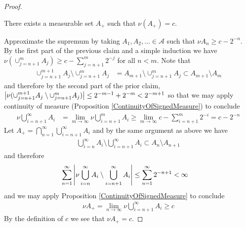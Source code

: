 \begin{proof}
\begin{clm}There exists a measurable set $A_+$ such that $\nu(A_+)=c$.
\end{clm}
Approximate the supremum by taking $A_1, A_2, \dots \in \mathcal{A}$ such that $\nu
  A_n \geq c - 2^{-n}$.  By the first part of the previous claim and a simple induction we have
$\nu(\cup_{j=n+1}^m A_j) \geq c - \sum_{j=n+1}^m 2^{-j}$ for all $n < m$.  Note that
\begin{align*}
\cup_{j=n+1}^{m+1} A_j \setminus \cup_{j=n+1}^{m} A_j &= A_{m+1} \setminus \cup_{j=n+1}^{m} A_j \subset A_{m+1} \setminus A_m
\end{align*}
and therefore by the second part of the prior claim, $\left \vert \nu(\cup_{j=n+1}^{m+1} A_j \setminus \cup_{j=n+1}^{m} A_j) \right \vert \leq 2^{-m-1} + 2^{-m} < 2^{-m+1}$
so that we may apply continuity of measure (Proposition \ref{ContinuityOfSignedMeasure}) to conclude
\begin{align*}
\nu \bigcup_{i=n+1}^\infty A_i &= \lim_{m \to \infty} \nu \bigcup_{i=n+1}^m A_i
\geq \lim_{m \to \infty} c - \sum_{i=n+1}^m 2^{-i} = c - 2^{-n}
\end{align*}
Let $A_+ = \bigcap_{n=1}^\infty \bigcup_{i=n+1}^\infty A_i$ and by the same argument as above we have
\begin{align*}
\bigcup_{i=n}^\infty A_i \setminus \bigcup_{i=n+1}^\infty A_i \subset A_n \setminus A_{n+1}
\end{align*}
and therefore 
\begin{align*}
\sum_{n=1}^\infty \left \vert  \nu \bigcup_{i=n}^\infty A_i \setminus \bigcup_{i=n+1}^\infty A_i \right \vert &\leq \sum_{n=1}^\infty 2^{-n+1} < \infty
\end{align*}
and we may apply Proposition \ref{ContinuityOfSignedMeasure} to conclude
\begin{align*} \nu A_+ = \lim_{n \to \infty} \nu
  \bigcup_{i=n+1}^\infty A_i \geq c
\end{align*}
By the definition of $c$ we see that $\nu A_+ = c$.  


\end{proof}

